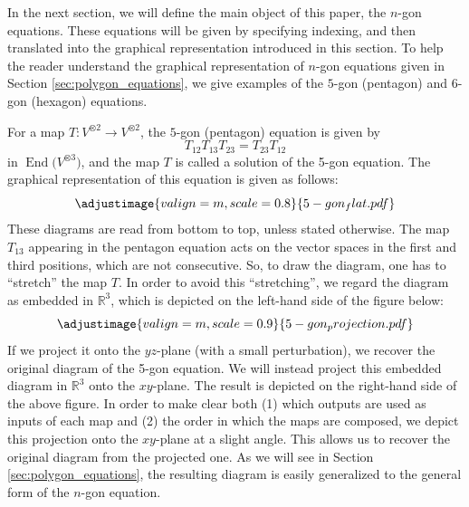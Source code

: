 \documentclass[pdftex]{sigma}
\numberwithin{equation}{section}
\theoremstyle{definition}
\begin{document}
In the next section, we will define the main object of this paper, the $n$-gon equations.
These equations will be given by specifying indexing, and then translated into the graphical representation introduced in this section.
To help the reader understand the graphical representation of $n$-gon equations given in Section \ref{sec:polygon_equations}, we give examples of the $5$-gon (pentagon) and $6$-gon (hexagon) equations.

For a map $T\colon V^{\otimes 2}\to V^{\otimes 2}$, the $5$-gon (pentagon) equation is given by
\begin{equation*}
T_{12}T_{13}T_{23}=T_{23}T_{12}
\end{equation*}
in $\operatorname{End}\bigl(V^{\otimes 3}\bigr)$, and the map $T$ is called a solution of the 5-gon equation.
The graphical representation of this equation is given as follows:
\begin{equation*}
 \adjustimage{valign=m, scale=0.8}{5-gon_flat.pdf}
\end{equation*}
These diagrams are read from bottom to top, unless stated otherwise.
The map $T_{13}$ appearing in the pentagon equation acts on the vector spaces in the first and third positions, which are not consecutive.
So, to draw the diagram, one has to ``stretch'' the map $T$.
In order to avoid this ``stretching'', we regard the diagram as embedded in $\mathbb{R}^3$, which is depicted on the left-hand side of the figure below:
\begin{equation*}
 \adjustimage{valign=m, scale=0.9}{5-gon_projection.pdf}
\end{equation*}
If we project it onto the $yz$-plane (with a small perturbation), we recover the original diagram of the 5-gon equation.
We will instead project this embedded diagram in $\mathbb{R}^3$ onto the $xy$-plane. The result is depicted on the right-hand side of the above figure.
In order to make clear both (1) which outputs are used as inputs of each map and (2) the order in which the maps are composed, we depict this projection onto the $xy$-plane at a slight angle. This allows us to recover the original diagram from the projected one.
As we will see in Section \ref{sec:polygon_equations}, the resulting diagram is easily generalized to the general form of the $n$-gon equation.
\end{document}
